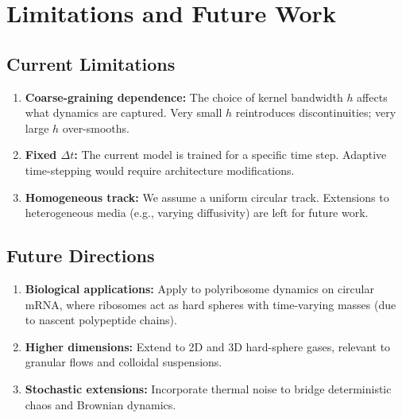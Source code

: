 \documentclass[11pt]{article}
\begin{document}
\section{Limitations and Future Work}

\subsection{Current Limitations}

\begin{enumerate}
    \item \textbf{Coarse-graining dependence:} The choice of kernel bandwidth $h$ affects what dynamics are captured. Very small $h$ reintroduces discontinuities; very large $h$ over-smooths.
    
    \item \textbf{Fixed $\Delta t$:} The current model is trained for a specific time step. Adaptive time-stepping would require architecture modifications.
    
    \item \textbf{Homogeneous track:} We assume a uniform circular track. Extensions to heterogeneous media (e.g., varying diffusivity) are left for future work.
\end{enumerate}

\subsection{Future Directions}

\begin{enumerate}
    \item \textbf{Biological applications:} Apply to polyribosome dynamics on circular mRNA, where ribosomes act as hard spheres with time-varying masses (due to nascent polypeptide chains).
    
    \item \textbf{Higher dimensions:} Extend to 2D and 3D hard-sphere gases, relevant to granular flows and colloidal suspensions.
    
    \item \textbf{Stochastic extensions:} Incorporate thermal noise to bridge deterministic chaos and Brownian dynamics.
\end{enumerate}

\end{document}
